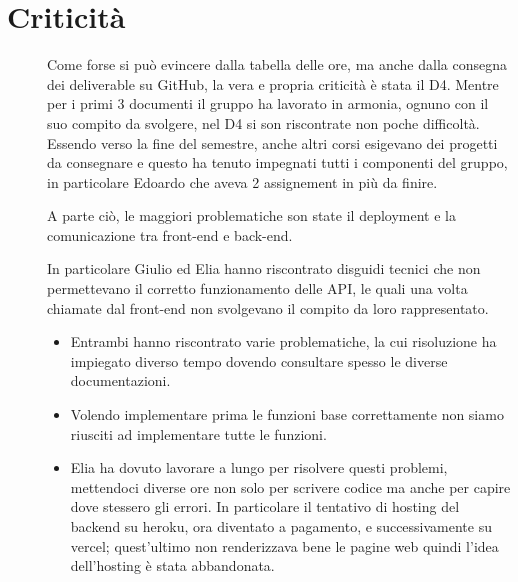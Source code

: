 \documentclass{article}
\begin{document}
\section{Criticità}
\begin{description}
    \item[] Come forse si può evincere dalla tabella delle ore, ma anche dalla consegna dei deliverable su GitHub, la vera e propria criticità è stata il D4. Mentre per i primi 3 documenti il gruppo ha lavorato in armonia, ognuno con il suo compito da svolgere, nel D4 si son riscontrate non poche difficoltà. Essendo verso la fine del semestre, anche altri corsi esigevano dei progetti da consegnare e questo ha tenuto impegnati tutti i componenti del gruppo, in particolare Edoardo che aveva 2 assignement in più da finire.
    \item[] A parte ciò, le maggiori problematiche son state il deployment e la comunicazione tra front-end e back-end.
    \item[] In particolare Giulio ed Elia hanno riscontrato disguidi tecnici che non permettevano il corretto funzionamento delle API, le quali una volta chiamate dal front-end non svolgevano il compito da loro rappresentato.
        \begin{itemize}
            \item Entrambi hanno riscontrato varie problematiche, la cui risoluzione ha impiegato diverso tempo dovendo consultare spesso le diverse documentazioni.
            \item Volendo implementare prima le funzioni base correttamente non siamo riusciti ad implementare tutte le funzioni.
            \item Elia ha dovuto lavorare a lungo per risolvere questi problemi, mettendoci diverse ore non solo per scrivere codice ma anche per capire dove stessero gli errori.
                  In particolare il tentativo di hosting del backend su heroku, ora diventato a pagamento, e successivamente su vercel; quest'ultimo non renderizzava bene le pagine web quindi l'idea dell'hosting è stata abbandonata.
        \end{itemize}
\end{description}
\clearpage
\end{document}
